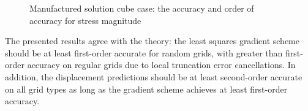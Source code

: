 \documentclass[sn-mathphys,Numbered]{sn-jnl}%
\begin{document}
\begin{figure}[htbp]
	\centering
	\caption{Manufactured solution cube case: the accuracy and order of accuracy for stress magnitude}
	\label{fig:mms_stress_accuracy}
\end{figure}

The presented results agree with the theory: the least squares gradient scheme should be at least first-order accurate for random grids, with greater than first-order accuracy on regular grids due to local truncation error cancellations.
In addition, the displacement predictions should be at least second-order accurate on all grid types as long as the gradient scheme achieves at least first-order accuracy.
\end{document}
